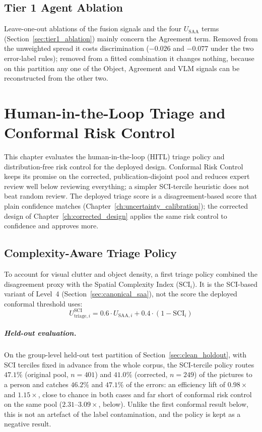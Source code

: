 \documentclass[12pt,a4paper]{report}
\begin{document}
\section{Tier 1 Agent Ablation}
Leave-one-out ablations of the fusion signals and the four $U_{\text{SAA}}$ terms (Section~\ref{sec:tier1_ablation}) mainly concern the Agreement term. Removed from the unweighted spread it costs discrimination ($-0.026$ and $-0.077$ under the two error-label rules); removed from a fitted combination it changes nothing, because on this partition any one of the Object, Agreement and VLM signals can be reconstructed from the other two.

\chapter{Human-in-the-Loop Triage and Conformal Risk Control}
\label{ch:triage_risk_control}

This chapter evaluates the human-in-the-loop (HITL) triage policy and distribution-free risk control for the deployed design. Conformal Risk Control keeps its promise on the corrected, publication-disjoint pool and reduces expert review well below reviewing everything; a simpler SCI-tercile heuristic does not beat random review. The deployed triage score is a disagreement-based score that plain confidence matches (Chapter~\ref{ch:uncertainty_calibration}); the corrected design of Chapter~\ref{ch:corrected_design} applies the same risk control to confidence and approves more.

\section{Complexity-Aware Triage Policy}
\label{sec:complexity_triage}
To account for visual clutter and object density, a first triage policy combined the disagreement proxy with the Spatial Complexity Index ($\text{SCI}_i$). It is the SCI-based variant of Level~4 (Section~\ref{sec:canonical_saa}), not the score the deployed conformal threshold uses:
\begin{equation}
    U^{\text{SCI}}_{\text{triage}, i} = 0.6 \cdot U_{\text{SAA}, i} + 0.4 \cdot (1 - \text{SCI}_i)
\end{equation}

\paragraph{Held-out evaluation.} On the group-level held-out test partition of Section~\ref{sec:clean_holdout}, with SCI terciles fixed in advance from the whole corpus, the SCI-tercile policy routes $47.1\%$ (original pool, $n=401$) and $41.0\%$ (corrected, $n=249$) of the pictures to a person and catches $46.2\%$ and $47.1\%$ of the errors: an efficiency lift of $0.98\times$ and $1.15\times$, close to chance in both cases and far short of conformal risk control on the same pool ($2.31$--$3.09\times$, below). Unlike the first conformal result below, this is not an artefact of the label contamination, and the policy is kept as a negative result.
\end{document}
